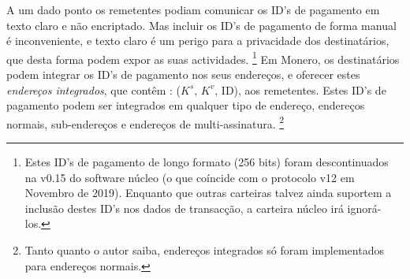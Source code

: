 A um dado ponto os remetentes podiam comunicar os ID's de pagamento em texto claro e não encriptado. Mas incluir os ID's de pagamento de forma manual é inconveniente, e texto claro é um perigo para a privacidade dos destinatários, que desta forma podem expor as suas actividades.
\footnote{Estes ID's de pagamento de longo formato (256 bits) foram descontinuados na v0.15 do software núcleo (o que coíncide com o protocolo v12 em Novembro de 2019). Enquanto que outras carteiras talvez ainda suportem a inclusão destes ID's nos dados de transacção, a carteira núcleo irá ignorá-los.}
Em Monero, os destinatários podem integrar os ID's de pagamento nos seus endereços, e oferecer estes {\em endereços integrados}, que contêm : ($K^s$, $K^v$, ID), aos remetentes. Estes ID's de pagamento podem ser integrados em qualquer tipo de endereço, endereços normais, sub-endereços e endereços de multi-assinatura. 
\footnote{Tanto quanto o autor saiba, endereços integrados só foram implementados para endereços normais.}

